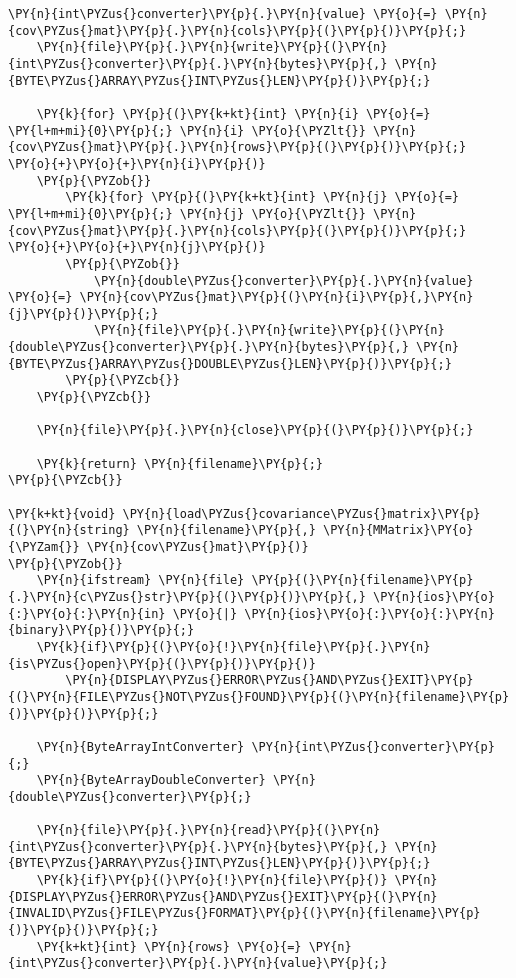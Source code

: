 \begin{Verbatim}[commandchars=\\\{\}]
    \PY{n}{int\PYZus{}converter}\PY{p}{.}\PY{n}{value} \PY{o}{=} \PY{n}{cov\PYZus{}mat}\PY{p}{.}\PY{n}{cols}\PY{p}{(}\PY{p}{)}\PY{p}{;}
    \PY{n}{file}\PY{p}{.}\PY{n}{write}\PY{p}{(}\PY{n}{int\PYZus{}converter}\PY{p}{.}\PY{n}{bytes}\PY{p}{,} \PY{n}{BYTE\PYZus{}ARRAY\PYZus{}INT\PYZus{}LEN}\PY{p}{)}\PY{p}{;}

    \PY{k}{for} \PY{p}{(}\PY{k+kt}{int} \PY{n}{i} \PY{o}{=} \PY{l+m+mi}{0}\PY{p}{;} \PY{n}{i} \PY{o}{\PYZlt{}} \PY{n}{cov\PYZus{}mat}\PY{p}{.}\PY{n}{rows}\PY{p}{(}\PY{p}{)}\PY{p}{;} \PY{o}{+}\PY{o}{+}\PY{n}{i}\PY{p}{)}
    \PY{p}{\PYZob{}}
    	\PY{k}{for} \PY{p}{(}\PY{k+kt}{int} \PY{n}{j} \PY{o}{=} \PY{l+m+mi}{0}\PY{p}{;} \PY{n}{j} \PY{o}{\PYZlt{}} \PY{n}{cov\PYZus{}mat}\PY{p}{.}\PY{n}{cols}\PY{p}{(}\PY{p}{)}\PY{p}{;} \PY{o}{+}\PY{o}{+}\PY{n}{j}\PY{p}{)}
    	\PY{p}{\PYZob{}}
    		\PY{n}{double\PYZus{}converter}\PY{p}{.}\PY{n}{value} \PY{o}{=} \PY{n}{cov\PYZus{}mat}\PY{p}{(}\PY{n}{i}\PY{p}{,}\PY{n}{j}\PY{p}{)}\PY{p}{;}
    		\PY{n}{file}\PY{p}{.}\PY{n}{write}\PY{p}{(}\PY{n}{double\PYZus{}converter}\PY{p}{.}\PY{n}{bytes}\PY{p}{,} \PY{n}{BYTE\PYZus{}ARRAY\PYZus{}DOUBLE\PYZus{}LEN}\PY{p}{)}\PY{p}{;}
    	\PY{p}{\PYZcb{}}
    \PY{p}{\PYZcb{}}

    \PY{n}{file}\PY{p}{.}\PY{n}{close}\PY{p}{(}\PY{p}{)}\PY{p}{;}

    \PY{k}{return} \PY{n}{filename}\PY{p}{;}
\PY{p}{\PYZcb{}}

\PY{k+kt}{void} \PY{n}{load\PYZus{}covariance\PYZus{}matrix}\PY{p}{(}\PY{n}{string} \PY{n}{filename}\PY{p}{,} \PY{n}{MMatrix}\PY{o}{\PYZam{}} \PY{n}{cov\PYZus{}mat}\PY{p}{)}
\PY{p}{\PYZob{}}
	\PY{n}{ifstream} \PY{n}{file} \PY{p}{(}\PY{n}{filename}\PY{p}{.}\PY{n}{c\PYZus{}str}\PY{p}{(}\PY{p}{)}\PY{p}{,} \PY{n}{ios}\PY{o}{:}\PY{o}{:}\PY{n}{in} \PY{o}{|} \PY{n}{ios}\PY{o}{:}\PY{o}{:}\PY{n}{binary}\PY{p}{)}\PY{p}{;}
	\PY{k}{if}\PY{p}{(}\PY{o}{!}\PY{n}{file}\PY{p}{.}\PY{n}{is\PYZus{}open}\PY{p}{(}\PY{p}{)}\PY{p}{)}
		\PY{n}{DISPLAY\PYZus{}ERROR\PYZus{}AND\PYZus{}EXIT}\PY{p}{(}\PY{n}{FILE\PYZus{}NOT\PYZus{}FOUND}\PY{p}{(}\PY{n}{filename}\PY{p}{)}\PY{p}{)}\PY{p}{;}

	\PY{n}{ByteArrayIntConverter} \PY{n}{int\PYZus{}converter}\PY{p}{;}
	\PY{n}{ByteArrayDoubleConverter} \PY{n}{double\PYZus{}converter}\PY{p}{;}

    \PY{n}{file}\PY{p}{.}\PY{n}{read}\PY{p}{(}\PY{n}{int\PYZus{}converter}\PY{p}{.}\PY{n}{bytes}\PY{p}{,} \PY{n}{BYTE\PYZus{}ARRAY\PYZus{}INT\PYZus{}LEN}\PY{p}{)}\PY{p}{;}
    \PY{k}{if}\PY{p}{(}\PY{o}{!}\PY{n}{file}\PY{p}{)} \PY{n}{DISPLAY\PYZus{}ERROR\PYZus{}AND\PYZus{}EXIT}\PY{p}{(}\PY{n}{INVALID\PYZus{}FILE\PYZus{}FORMAT}\PY{p}{(}\PY{n}{filename}\PY{p}{)}\PY{p}{)}\PY{p}{;}
    \PY{k+kt}{int} \PY{n}{rows} \PY{o}{=} \PY{n}{int\PYZus{}converter}\PY{p}{.}\PY{n}{value}\PY{p}{;}


\end{Verbatim}
